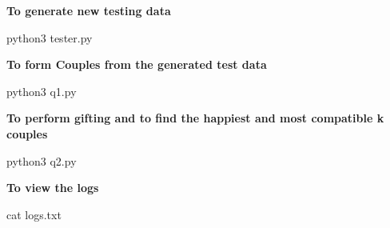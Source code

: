 {\bfseries To generate new testing data}


\begin{DoxyCode}
python3 tester.py
\end{DoxyCode}


{\bfseries To form Couples from the generated test data}


\begin{DoxyCode}
python3 q1.py
\end{DoxyCode}


{\bfseries To perform gifting and to find the happiest and most compatible k couples}


\begin{DoxyCode}
python3 q2.py
\end{DoxyCode}


{\bfseries To view the logs}


\begin{DoxyCode}
cat logs.txt
\end{DoxyCode}
 
